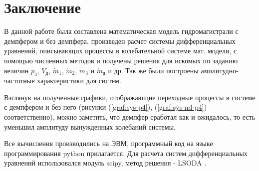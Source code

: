 \section{Заключение}

В данной работе была составлена математическая модель гидромагистрали с демпфером и без демпфера, произведен расчет системы дифференциальных уравнений, описывающих процессы в колебательной системе мат. модели, с помощью численных методов и получены решения для искомых по заданию величин  $p_4$, $V_{\text{д}}$, $\dot{m}_1$, $\dot{m}_2$, $\dot{m}_3$ и $\dot{m}_{\text{д}}$ и др. Так же были построены амплитудно-частотные характеристики для систем.

Взглянув на полученные графики, отображающие переходные процессы в системе с демпфером и без него (рисунки (\ref{graf:sys-p4}), (\ref{graf:sys-nd-p4}) соответственно), можно заметить, что демпфер сработал как и ожидалось, то есть уменьшил амплитуду вынужденных колебаний системы.

Все вычисления производились на ЭВМ, программный код на языке программирования python прилагается. Для расчета систем дифференциальных уравнений использовался модуль scipy, метод решения - LSODA \cite{metod}.